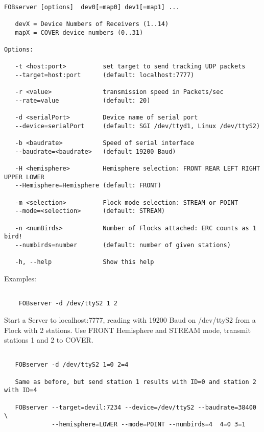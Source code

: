 \small \begin{verbatim}

FOBserver [options]  dev0[=map0] dev1[=map1] ...

   devX = Device Numbers of Receivers (1..14)
   mapX = COVER device numbers (0..31)

Options:

   -t <host:port>          set target to send tracking UDP packets
   --target=host:port      (default: localhost:7777)

   -r <value>              transmission speed in Packets/sec
   --rate=value            (default: 20)

   -d <serialPort>         Device name of serial port
   --device=serialPort     (default: SGI /dev/ttyd1, Linux /dev/ttyS2)

   -b <baudrate>           Speed of serial interface
   --baudrate=<baudrate>   (default 19200 Baud)

   -H <hemisphere>         Hemisphere selection: FRONT REAR LEFT RIGHT UPPER LOWER
   --Hemisphere=Hemisphere (default: FRONT)

   -m <selection>          Flock mode selection: STREAM or POINT
   --mode=<selection>      (default: STREAM)

   -n <numBirds>           Number of Flocks attached: ERC counts as 1 bird!
   --numbirds=number       (default: number of given stations)

   -h, --help              Show this help

\end{verbatim} \normalsize


Examples:

\small \begin{verbatim}   

    FOBserver -d /dev/ttyS2 1 2

\end{verbatim} \normalsize

   Start a Server to localhost:7777, reading with 19200 Baud on /dev/ttyS2
   from a Flock with 2 stations. Use FRONT Hemisphere and STREAM mode,
   transmit stations 1 and 2 to COVER.


\small \begin{verbatim}   

   FOBserver -d /dev/ttyS2 1=0 2=4

   Same as before, but send station 1 results with ID=0 and station 2 with ID=4

   FOBserver --target=devil:7234 --device=/dev/ttyS2 --baudrate=38400 \
             --hemisphere=LOWER --mode=POINT --numbirds=4  4=0 3=1
\end{verbatim} \normalsize

